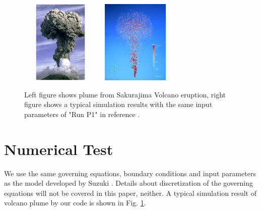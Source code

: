 \documentclass[procedia]{easychair}
\begin{document}
\begin{figure}[!t]
\centering
\includegraphics[width=3.8cm,height=4.0cm]{plume_photo}
\hfil
\includegraphics[width=3.8cm,height=4.0cm]{Plume_simulation}
\caption{Left figure shows plume from Sakurajima Volcano eruption\cite{PlumePhoto}, right figure shows a typical simulation results with the same input parameters of "Run P1" in reference \cite{suzuki2005numerical}.}
\label{fig:Plume}
\end{figure}
\section{Numerical Test}
We use the same governing equations, boundary conditions and input parameters as the model developed by Suzuki \cite{suzuki2005numerical}. Details about discretization of the governing equations will not be covered in this paper, neither. A typical simulation result of volcano plume by our code is shown in Fig. \ref{fig:Plume}.
%
\end{document}
